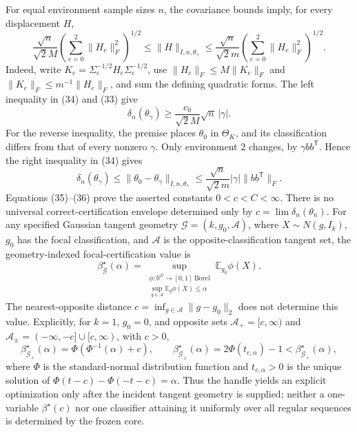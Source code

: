 For equal environment sample sizes \(n\), the covariance bounds imply, for every displacement \(H\),
\[
 \frac{\sqrt n}{\sqrt2M}\left(\sum_{e=0}^2\lVert H_e\rVert_F^2\right)^{1/2}
 \le\lVert H\rVert_{I,n,\theta_\gamma}
 \le\frac{\sqrt n}{\sqrt2m}\left(\sum_{e=0}^2\lVert H_e\rVert_F^2\right)^{1/2}. \tag{34}
\]
Indeed, write \(K_e=\Sigma_e^{-1/2}H_e\Sigma_e^{-1/2}\), use
\(\lVert H_e\rVert_F\le M\lVert K_e\rVert_F\) and
\(\lVert K_e\rVert_F\le m^{-1}\lVert H_e\rVert_F\), and sum the defining quadratic forms.  The left inequality in (34) and (33) give
\[
 \delta_n(\theta_\gamma)\ge\frac{c_0}{\sqrt2M}\sqrt n\,|\gamma|. \tag{35}
\]
For the reverse inequality, the premise places \(\theta_0\) in \(\Theta_K\), and its classification differs from that of every nonzero \(\gamma\).  Only environment \(2\) changes, by \(\gamma bb^{\mathsf T}\).  Hence the right inequality in (34) gives
\[
 \delta_n(\theta_\gamma)
 \le\lVert\theta_0-\theta_\gamma\rVert_{I,n,\theta_\gamma}
 \le\frac{\sqrt n}{\sqrt2m}|\gamma|\lVert bb^{\mathsf T}\rVert_F. \tag{36}
\]
Equations (35)--(36) prove the asserted constants \(0<c<C<\infty\).
There is no universal correct-certification envelope determined only by \(c=\lim\delta_n(\theta_n)\).  For any specified Gaussian tangent geometry \(\mathcal G=(k,g_0,\mathcal A)\), where \(X\sim N(g,I_k)\), \(g_0\) has the focal classification, and \(\mathcal A\) is the opposite-classification tangent set, the geometry-indexed focal-certification value is
\[
 \beta^{\star}_{\mathcal G}(\alpha)
 =\sup_{\substack{\phi:\mathbb R^k\to[0,1]\ \mathrm{Borel}\\
                    \sup_{g\in\mathcal A}\mathbb E_g\phi(X)\le\alpha}}
   \mathbb E_{g_0}\phi(X).
\]
The nearest-opposite distance \(c=\inf_{g\in\mathcal A}\lVert g-g_0\rVert_2\) does not determine this value.  Explicitly, for \(k=1\), \(g_0=0\), and opposite sets \(\mathcal A_+=[c,\infty)\) and \(\mathcal A_{\pm}=(-\infty,-c]\cup[c,\infty)\), with \(c>0\),
\[
 \beta^{\star}_{\mathcal G_+}(\alpha)=\Phi(\Phi^{-1}(\alpha)+c),
 \qquad
 \beta^{\star}_{\mathcal G_{\pm}}(\alpha)=2\Phi(t_{c,\alpha})-1
 <\beta^{\star}_{\mathcal G_+}(\alpha),
\]
where \(\Phi\) is the standard-normal distribution function and \(t_{c,\alpha}>0\) is the unique solution of \(\Phi(t-c)-\Phi(-t-c)=\alpha\).  Thus the handle yields an explicit optimization only after the incident tangent geometry is supplied; neither a one-variable \(\beta^{\star}(c)\) nor one classifier attaining it uniformly over all regular sequences is determined by the frozen core.
